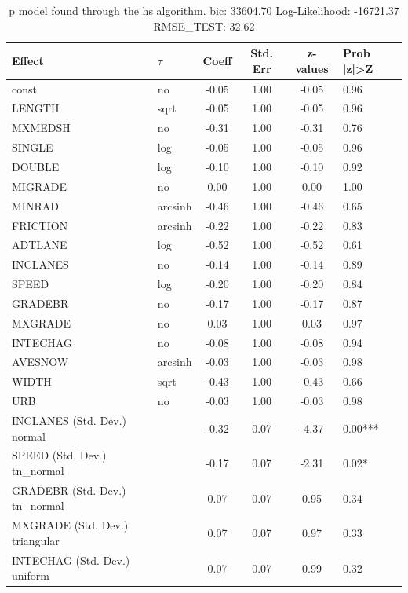 \begin{table}
	\caption{p model found through the hs algorithm. bic: 33604.70 Log-Likelihood: -16721.37 RMSE_TEST: 32.62}
	\begin{center}
		\begin{tabular}{|l|l|c|c|c|l|}
			\hline
			Effect & $\tau$ & Coeff & Std. Err & z-values & Prob |z|>Z \\
			\hline
			const & no & -0.05 & 1.00 & -0.05 & 0.96 \\
			\hline
			LENGTH & sqrt & -0.05 & 1.00 & -0.05 & 0.96 \\
			\hline
			MXMEDSH & no & -0.31 & 1.00 & -0.31 & 0.76 \\
			\hline
			SINGLE & log & -0.05 & 1.00 & -0.05 & 0.96 \\
			\hline
			DOUBLE & log & -0.10 & 1.00 & -0.10 & 0.92 \\
			\hline
			MIGRADE & no & 0.00 & 1.00 & 0.00 & 1.00 \\
			\hline
			MINRAD & arcsinh & -0.46 & 1.00 & -0.46 & 0.65 \\
			\hline
			FRICTION & arcsinh & -0.22 & 1.00 & -0.22 & 0.83 \\
			\hline
			ADTLANE & log & -0.52 & 1.00 & -0.52 & 0.61 \\
			\hline
			INCLANES & no & -0.14 & 1.00 & -0.14 & 0.89 \\
			\hline
			SPEED & log & -0.20 & 1.00 & -0.20 & 0.84 \\
			\hline
			GRADEBR & no & -0.17 & 1.00 & -0.17 & 0.87 \\
			\hline
			MXGRADE & no & 0.03 & 1.00 & 0.03 & 0.97 \\
			\hline
			INTECHAG & no & -0.08 & 1.00 & -0.08 & 0.94 \\
			\hline
			AVESNOW & arcsinh & -0.03 & 1.00 & -0.03 & 0.98 \\
			\hline
			WIDTH & sqrt & -0.43 & 1.00 & -0.43 & 0.66 \\
			\hline
			URB & no & -0.03 & 1.00 & -0.03 & 0.98 \\
			\hline
			INCLANES (Std. Dev.) normal &  & -0.32 & 0.07 & -4.37 & 0.00*** \\
			\hline
			SPEED (Std. Dev.) tn_normal &  & -0.17 & 0.07 & -2.31 & 0.02* \\
			\hline
			GRADEBR (Std. Dev.) tn_normal &  & 0.07 & 0.07 & 0.95 & 0.34 \\
			\hline
			MXGRADE (Std. Dev.) triangular &  & 0.07 & 0.07 & 0.97 & 0.33 \\
			\hline
			INTECHAG (Std. Dev.) uniform &  & 0.07 & 0.07 & 0.99 & 0.32 \\

\end{tabular}
\end{center}
\end{table}
